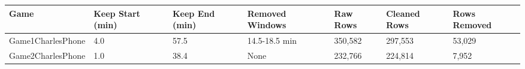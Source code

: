 \begin{tabular}{lllllll}
\toprule
Game & Keep Start (min) & Keep End (min) & Removed Windows & Raw Rows & Cleaned Rows & Rows Removed \\
\midrule
Game1CharlesPhone & 4.0 & 57.5 & 14.5-18.5 min & 350,582 & 297,553 & 53,029 \\
Game2CharlesPhone & 1.0 & 38.4 & None & 232,766 & 224,814 & 7,952 \\
\bottomrule
\end{tabular}
